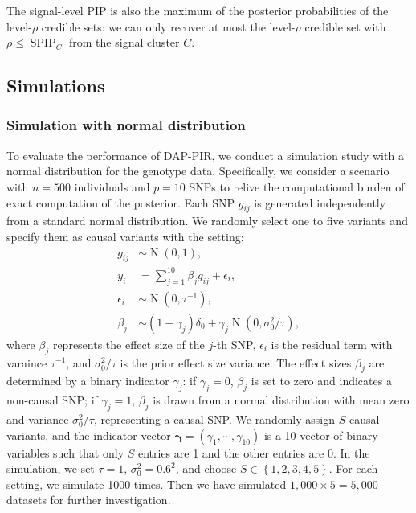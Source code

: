 \documentclass[pdflatex,sn-mathphys-num]{sn-jnl}%
\theoremstyle{thmstyleone}%
\theoremstyle{thmstyletwo}%
\theoremstyle{thmstylethree}%
\begin{document}
The signal-level PIP is also the maximum of the posterior probabilities of the level-$\rho$ credible sets: we can only recover at most the level-$\rho$ credible set with $\rho \leq \operatorname{SPIP}_{C}$ from the signal cluster $C$.



\subsection{Simulations}\label{subsec2}
\subsubsection{Simulation with normal distribution}
To evaluate the performance of DAP-PIR, we conduct a simulation study with a normal distribution for the genotype data. Specifically, we consider a scenario with $n=500$ individuals and $p=10$ SNPs to relive the computational burden of exact computation of the posterior. Each SNP $g_{ij}$ is generated independently from a standard normal distribution. We randomly select one to five variants and specify them as causal variants with the setting:
\begin{align}
    g_{ij} &\sim \operatorname{N}\left(0,1\right),\\
    y_i &= \sum_{j=1}^{10} \beta_j g_{ij}  + \epsilon_i,\\
    \epsilon_i &\sim \operatorname{N}(0, \tau^{-1}),\\
    \beta_j  &\sim (1-\gamma_j)\delta_0 + \gamma_j\operatorname{N}\left(0, \sigma^2_{0}/\tau\right),
\end{align}
where $\beta_j$ represents the effect size of the $j$-th SNP, $\epsilon_i$ is the residual term with varaince $\tau^{-1}$, and $\sigma_0^2/\tau$ is the prior effect size variance. The effect sizes $\beta_j$ are determined by a binary indicator $\gamma_j$: if $\gamma_j=0$, $\beta_j$ is set to zero and indicates a non-causal SNP; if $\gamma_j=1$, $\beta_j$ is drawn from a normal distribution with mean zero and variance $\sigma^2_0/\tau$, representing a causal SNP. We randomly assign $S$ causal variants, and the indicator vector $\boldsymbol{\gamma} = \left(\gamma_1,\cdots,\gamma_{10}\right)$ is a 10-vector of binary variables such that only $S$ entries are 1 and the other entries are 0. In the simulation, we set $\tau=1$, $\sigma^2_0 = 0.6^2$, and choose $S \in \left\{1,2,3,4,5\right\}$. For each setting, we simulate 1000 times. Then we have simulated $1,000\times 5 = 5,000$ datasets for further investigation.
\end{document}
